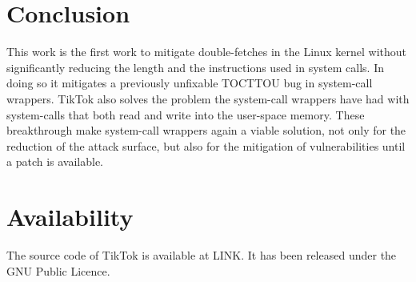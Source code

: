 \section{Conclusion}

This work is the first work to mitigate double-fetches in the Linux kernel
without significantly reducing the length and the instructions used in system
calls. In doing so it mitigates a previously unfixable TOCTTOU bug in
system-call wrappers. TikTok also solves the problem the system-call wrappers
have had with system-calls that both read and write into the user-space memory.
These breakthrough make system-call wrappers again a viable solution, not only
for the reduction of the attack surface, but also for the mitigation of
vulnerabilities until a patch is available.

\section*{Availability}

The source code of TikTok is available at LINK. It has been released under the
GNU Public Licence.






